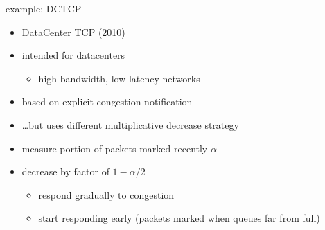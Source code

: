 
\begin{frame}{example: DCTCP}
    \begin{itemize}
    \item DataCenter TCP (2010)
    \item intended for datacenters
        \begin{itemize}
        \item high bandwidth, low latency networks
        \end{itemize}
    \item based on explicit congestion notification
    \item \ldots but uses different multiplicative decrease strategy
    \vspace{.5cm}
    \item measure portion of packets marked recently $\alpha$ 
    \item decrease by factor of $1-\alpha/2$
        \begin{itemize}
        \item respond gradually to congestion
        \item start responding early (packets marked when queues far from full)
        \end{itemize}
    \end{itemize}
\end{frame}
